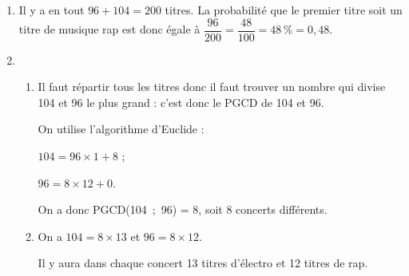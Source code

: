 
\medskip

%

\begin{enumerate}
\item %
Il y a en tout $96 + 104 = 200$ titres. La probabilité que le premier titre soit un titre de musique rap est donc égale à $\dfrac{96}{200} = \dfrac{48}{100} = 48\,\%= 0,48$.
\item %
	\begin{enumerate}
		\item %
Il faut répartir tous les titres donc il faut trouver un nombre qui divise 104 et 96 le plus grand : c'est donc le PGCD de 104 et 96.

On utilise l'algorithme d'Euclide :

$104 = 96 \times 1 + 8$ ;

$96 = 8 \times 12 + 0$.

On a donc PGCD(104~;~96) = 8, soit 8 concerts différents.
		\item %
On a $104 = 8 \times 13$ et $96 = 8 \times 12$.

Il y aura dans chaque concert 13 titres d'électro et 12 titres de rap.
	\end{enumerate}
\end{enumerate}
\vspace{0.25cm}


